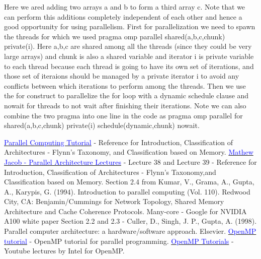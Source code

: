 \documentclass[12pt]{article}
\newcommand{\weblink}[2]{\href{#1}{\textcolor{blue}{#2}}}
\begin{document}
Here we ared adding two arrays a and b to form a third array c.
Note that we can perform this additions completely independent of each other and hence a good opportunity 
for using parallelism.
First for parallelization we need to spawn the threads for which we used pragma omp parallel shared(a,b,c,chunk) private(i).
Here a,b,c are shared among all the threads (since they could be very large arrays) and chunk is also a shared variable and iterator i is private variable to each thread because each thread is going to 
have its own set of iterations, and those set of iteraions should be managed by a private iterator i to avoid any conflicts between which iterations to perform among the threads. 
Then we use the for construct to parallelize the for loop with a dynamic schedule clause and nowait for threads to not wait after finishing their iterations.
Note we can also combine the two pragma into one line in the code as pragma omp parallel for shared(a,b,c,chunk) private(i) schedule(dynamic,chunk) nowait.










    









\newpage

\begin{thebibliography}{9}
    \weblink{http://www.llnl.gov/computing/tutorials/parallel_comp/}{Parallel Computing Tutorial} - Reference for Introduction, Classification of Architectures - Flynn's Taxonomy, and Classification based on Memory.
    \weblink{https://youtu.be/-yMWgtTeQgY?si=_PIhzFH7zZTydzcM}{Mathew Jacob - Parallel Architecture Lectures} - Lecture 38 and Lecture 39 - Reference for Introduction, Classification of Architectures - Flynn's Taxonomy,and Classification based on Memory.
    Section 2.4 from Kumar, V., Grama, A., Gupta, A., Karypis, G. (1994). Introduction to parallel computing (Vol. 110). Redwood City, CA: Benjamin/Cummings for Network Topology, Shared Memory Architecture and Cache Coherence Protocols.
    Many-core - Google for NVIDIA A100 white paper
    Section 2.2 and 2.3 - Culler, D., Singh, J. P., Gupta, A. (1998). Parallel computer architecture: a hardware/software approach. Elsevier.
    \weblink{https://hpc-tutorials.llnl.gov/openmp/}{OpenMP tutorial} - OpenMP tutorial for parallel programming.
    \weblink{https://www.youtube.com/watch?v=nE-xN4Bf8XI&list=PLLX-Q6B8xqZ8n8bwjGdzBJ25X2utwnoEG}{OpenMP Tutorials} - Youtube lectures by Intel for OpenMP.

\end{thebibliography}
\end{document}
